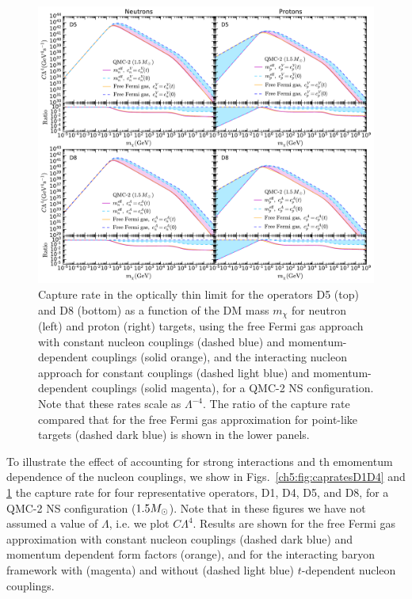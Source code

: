 \begin{figure}[t!bp] 
\centering
\includegraphics[width=\textwidth]{capture_3/C_mDM_N_QMC_D5_D8_ratio.pdf}
\caption{
Capture rate in the optically thin limit for the operators D5 (top) and D8 (bottom) as a function of the DM mass $m_\chi$ for neutron (left) and proton (right) targets,
using the free Fermi gas approach with constant nucleon couplings (dashed blue) and momentum-dependent couplings (solid orange), and the interacting nucleon approach for constant couplings (dashed light blue)  and momentum-dependent couplings (solid magenta), for a QMC-2 NS configuration. 
Note that these rates scale as $\Lambda^{-4}$. 
The ratio of the capture rate compared that for the free Fermi gas approximation for point-like targets (dashed dark blue) is shown in the lower panels. 
}
\label{ch5:fig:capratesD5D8}
\end{figure} 

To illustrate the effect of accounting for strong interactions and th emomentum dependence of the nucleon couplings, we show in  Figs.~\ref{ch5:fig:capratesD1D4} and \ref{ch5:fig:capratesD5D8} the capture rate for four representative operators, D1, D4, D5, and D8, for a QMC-2 NS configuration ($1.5M_\odot$). 
Note that in these figures we have not assumed a value of $\Lambda$, i.e. we plot $C \Lambda^4$. 
Results are shown for the free Fermi gas approximation with constant nucleon couplings (dashed dark blue) and momentum dependent form factors (orange), and for the interacting baryon framework with (magenta) and without (dashed light blue) $t$-dependent nucleon couplings.
 

